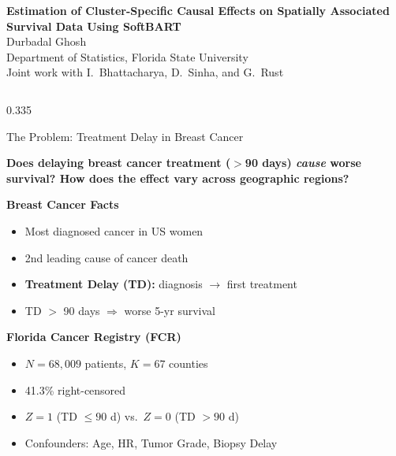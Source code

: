 \documentclass[final]{beamer}
\begin{document}
\begin{frame}[fragile]

\begin{tcolorbox}[
  colback=FSUgarnet, colframe=FSUgarnet, arc=0mm, boxrule=0pt,
  top=8pt, bottom=5pt, left=30pt, right=30pt, width=\textwidth
]
\centering
{\color{FSUgold}\VeryHuge\bfseries Estimation of Cluster-Specific Causal Effects on Spatially Associated Survival Data Using SoftBART}\\[10pt]
{\color{white}\LARGE Durbadal Ghosh}\\[3pt]
{\color{FSUgold}\large Department of Statistics, Florida State University}\\[2pt]
{\color{white}\small Joint work with I.\ Bhattacharya, D.\ Sinha, and G.\ Rust}
\end{tcolorbox}

\vspace{5pt}

\begin{columns}[T]

\begin{column}{0.335\textwidth}

\begin{posterblock}{The Problem: Treatment Delay in Breast Cancer}

\begin{keybox}
\centering
\textbf{Does delaying breast cancer treatment ($>$90 days) \emph{cause} worse survival? How does the effect vary across geographic regions?}
\end{keybox}

\vspace{4pt}

\begin{minipage}[t]{0.47\textwidth}
{\color{FSUgarnet}\textbf{Breast Cancer Facts}}
\begin{itemize}
\item Most diagnosed cancer in US women
\item 2nd leading cause of cancer death
\item \textbf{Treatment Delay (TD):} diagnosis $\to$ first treatment
\item TD $>$ 90 days $\Rightarrow$ worse 5-yr survival
\end{itemize}
\end{minipage}\hfill
\begin{minipage}[t]{0.50\textwidth}
{\color{FSUgarnet}\textbf{Florida Cancer Registry (FCR)}}
\begin{itemize}
\item $N = 68{,}009$ patients, $K = 67$ counties
\item 41.3\% right-censored
\item $Z\!=\!1$ (TD $\leq 90$ d) vs.\ $Z\!=\!0$ (TD $> 90$ d)
\item Confounders: Age, HR, Tumor Grade, Biopsy Delay
\end{itemize}
\end{minipage}
\end{posterblock}


\end{column}
\end{columns}
\end{frame}
\end{document}
